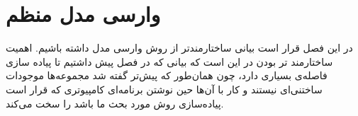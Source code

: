 \chapter{وارسی مدل منظم}
در این فصل قرار است بیانی ساختارمندتر از روش وارسی مدل داشته باشیم. اهمیت ساختارمند تر بودن در این است که بیانی که در فصل پیش داشتیم تا پیاده سازی فاصله‌ی بسیاری دارد، چون همان‌طور که پیش‌تر گفته شد مجموعه‌ها موجودات ساختنی‌ای نیستند و کار با آن‌ها حین نوشتن برنامه‌ای کامپیوتری‌ که قرار است پیاده‌سازی روش مورد بحث ما باشد را سخت می‌کند.